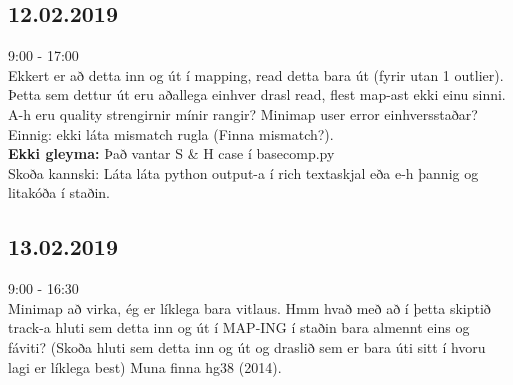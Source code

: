 \documentclass{article}
\begin{document}
\subsection*{12.02.2019}
9:00 - 17:00 \\
Ekkert er að detta inn og út í mapping, read detta bara út (fyrir utan 1 outlier). Þetta sem dettur út eru aðallega einhver drasl read, flest map-ast ekki einu sinni. \\
A-h eru quality strengirnir mínir rangir? Minimap user error einhversstaðar? Einnig: ekki láta mismatch rugla (Finna mismatch?).\\
\textbf{Ekki gleyma: } 
Það vantar S \& H case í basecomp.py \\
Skoða kannski: Láta láta python output-a í rich textaskjal eða e-h þannig og litakóða í staðin.\\

\subsection*{13.02.2019}
9:00 - 16:30\\
Minimap að virka, ég er líklega bara vitlaus. 	
Hmm hvað með að í þetta skiptið track-a hluti sem detta inn og út í MAP-ING í staðin bara almennt eins og fáviti? (Skoða hluti sem detta inn og út og draslið sem er bara úti sitt í hvoru lagi er líklega best)
Muna finna hg38 (2014).
\end{document}

